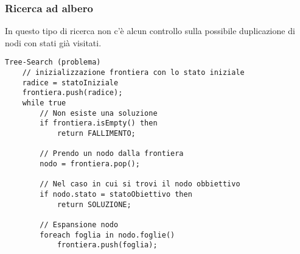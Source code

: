 \newpage
\subsubsection{Ricerca ad albero}
In questo tipo di ricerca non c'\`e alcun controllo sulla possibile
duplicazione di nodi con stati gi\`a visitati.

\begin{lstlisting}[language=pseudo, style=pseudo-style]
Tree-Search (problema)
	// inizializzazione frontiera con lo stato iniziale
	radice = statoIniziale
	frontiera.push(radice);
	while true
		// Non esiste una soluzione
		if frontiera.isEmpty() then
			return FALLIMENTO;
		
		// Prendo un nodo dalla frontiera
		nodo = frontiera.pop();

		// Nel caso in cui si trovi il nodo obbiettivo
		if nodo.stato = statoObiettivo then
			return SOLUZIONE;
		
		// Espansione nodo
		foreach foglia in nodo.foglie()
			frontiera.push(foglia);
\end{lstlisting}
